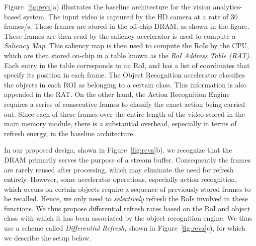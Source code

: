 
\begin{figure*}[ht!]
\begin{minipage}[b]{0.36\linewidth}
\raggedleft
{}
\caption{\label{fig:reva}a) Baseline architecture}
\end{minipage}
\addtocounter{figure}{-1}
\begin{minipage}[b]{0.37\linewidth}
\centering
{}
\caption{\label{fig:reva}b) Architecture of Proposed System}
\end{minipage}
\addtocounter{figure}{-1}
\begin{minipage}[b]{0.25\linewidth}
\raggedright
{}
\caption{\label{fig:reva}c) Design of REVA block}
\end{minipage}
\end{figure*}


Figure~\ref{fig:reva}a) illustrates the baseline architecture for the vision analytics-based system. The input video is captured by the HD camera at a rate of 30 frames/s. 
These frames are stored in the off-chip DRAM, as shown in the figure. These frames are then read by the saliency accelerator is used to compute a \emph{Saliency Map}. This saliency map is then used to compute the RoIs by the CPU, which are then stored on-chip in a table known as the \emph{RoI Address Table (RAT)}. Each entry in the table corresponds to an RoI, and has a list of coordinates that specify its position in each frame. 
The Object Recognition accelerator classifies the objects in each ROI as belonging to a certain class. This information is also appended in the RAT.
On the other hand, the Action Recognition Engine requires a series of consecutive frames to classify the exact action being carried out. 
Since each of these frames over the entire length of the video stored in the main memory module, there is a substantial overhead, especially in terms of refresh energy, in the baseline architecture. 

In our proposed design, shown in Figure~\ref{fig:reva}b), we recognize that the DRAM primarily serves the purpose of a stream buffer. Consequently the frames are rarely reused after processing, which may eliminate the need for refresh entirely. 
However, some accelerator operations, especially action recognition, which occurs on certain objects require a sequence of previously stored frames to be recalled. Hence, we only need to \emph{selectively} refresh the RoIs involved in these functions. We thus propose differential refresh rates based on the RoI and object class with which it has been associated by the object recognition engine.
We thus use a scheme called \emph{Differential Refresh}, shown in Figure~\ref{fig:reva}c), for which we describe the setup below.

